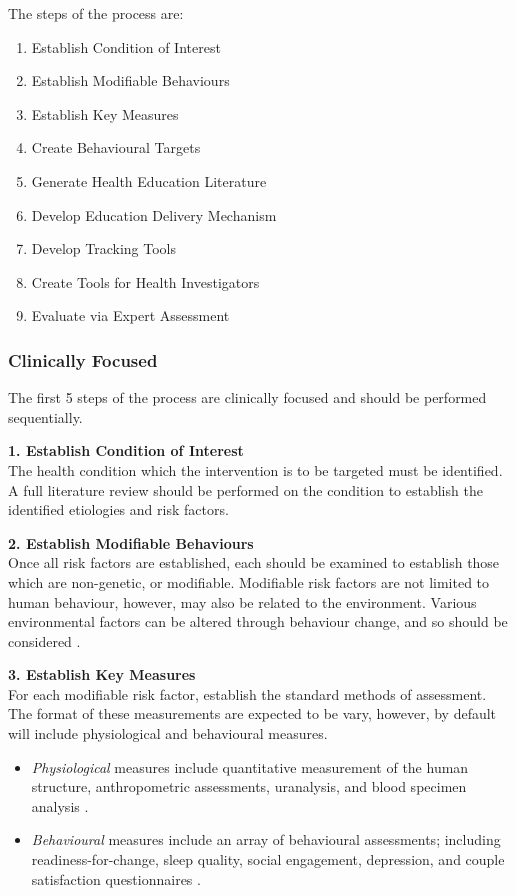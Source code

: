 The steps of the process are:
\begin{enumerate}[noitemsep,topsep=0pt]
\item Establish Condition of Interest
\item Establish Modifiable Behaviours
\item Establish Key Measures
\item Create Behavioural Targets
\item Generate Health Education Literature
\item Develop Education Delivery Mechanism
\item Develop Tracking Tools
\item Create Tools for Health Investigators
\item Evaluate via Expert Assessment
\end{enumerate}

\subsubsection{Clinically Focused}
The first 5 steps of the process are clinically focused and should be performed sequentially.

\textbf{1. Establish Condition of Interest} \\
The health condition which the intervention is to be targeted must be identified. A full literature review should be performed on the condition to establish the identified etiologies and risk factors.

\textbf{2. Establish Modifiable Behaviours} \\
Once all risk factors are established, each should be examined to establish those which are non-genetic, or modifiable. Modifiable risk factors are not limited to human behaviour, however, may also be related to the environment. Various environmental factors can be altered through behaviour change, and so should be considered \cite{Kujala2002}.

\textbf{3. Establish Key Measures}\\
For each modifiable risk factor, establish the standard methods of assessment. The format of these measurements are expected to be vary, however, by default will include physiological and behavioural measures.
\begin{itemize}[noitemsep,topsep=0pt]
\item \emph{Physiological} measures include quantitative measurement of the human structure, anthropometric assessments, uranalysis, and blood specimen analysis \cite{Oberg2014}.
\item \emph{Behavioural} measures include an array of behavioural assessments; including readiness-for-change, sleep quality, social engagement, depression, and couple satisfaction questionnaires  \cite{Martin2007}.
\end{itemize}

